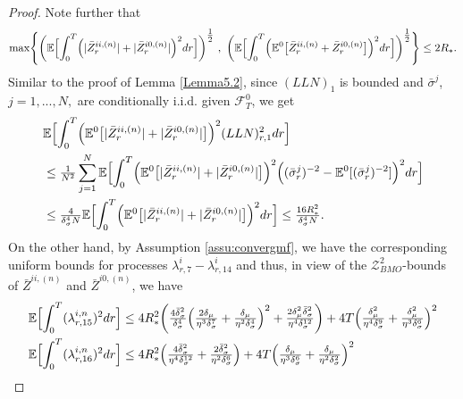 \documentclass[10pt,a4paper]{article}
\theoremstyle{plain}
\theoremstyle{definition}
\numberwithin{equation}{section}
\begin{document}
\begin{proof}
Note further that
\begin{align}
\max\Biggl\{\biggl(\mathbb{E}\Bigl[\int_{0}^{T}\Bigl(|\bar{Z}_{r}^{ii,(n)}| + |\bar{Z}_{r}^{i0,(n)}|\Bigr)^{2}dr\Bigr]\biggr)^{\tfrac{1}{2}} \ , \ \biggl(\mathbb{E}\Bigl[\int_{0}^{T}\Bigl(\mathbb{E}^{0}\bigl[\bar{Z}_{r}^{ii,(n)}+\bar{Z}_{r}^{i0,(n)}\bigr]\Bigr)^{2}dr\Bigr]\biggr)^{\tfrac{1}{2}}\Biggr\} \leq 2R_{*}. \label{equ:5.est1}
\end{align}
Similar to the proof of Lemma \ref{Lemma5.2}, since $(LLN)_{1}$ is bounded and $\bar{\sigma}^{j}$, $j=1,...,N,$ are conditionally i.i.d. given $\mathcal{F}_{T}^{0}$, we get
\begin{align}
&\mathbb{E}\Bigl[\int_{0}^{T}\Bigl(\mathbb{E}^{0}\bigl[|\bar{Z}_{r}^{ii,(n)}|+|\bar{Z}_{r}^{i0,(n)}|\bigr]\Bigr)^{2}(LLN)_{r,1}^{2}dr\Bigr] \nonumber \\
&\leq \tfrac{1}{N^{2}}\sum_{j=1}^{N}\mathbb{E}\Bigl[\int_{0}^{T}\Bigl(\mathbb{E}^{0}\bigl[|\bar{Z}_{r}^{ii,(n)}|+|\bar{Z}_{r}^{i0,(n)}|\bigr]\Bigr)^{2}\Bigl((\bar{\sigma}_{r}^{j})^{-2}-\mathbb{E}^{0}[(\bar{\sigma}_{r}^{j})^{-2}]\Bigr)^{2}dr\Bigr] \nonumber \\
&\leq \tfrac{4}{\delta_{\sigma}^{4}N}\mathbb{E}\Bigl[\int_{0}^{T}\Bigl(\mathbb{E}^{0}\bigl[|\bar{Z}_{r}^{ii,(n)}|+|\bar{Z}_{r}^{i0,(n)}|\bigr]\Bigr)^{2}dr\Bigr] 
\leq \tfrac{16R_{*}^{2}}{\delta_{\sigma}^{4}N}. \label{equ:5.est2}
\end{align}
On the other hand, by Assumption \ref{assu:convergmf}, we have the corresponding uniform bounds for processes $\lambda_{r,7}^{i}-\lambda_{r,14}^{i}$ and thus, in view of the $\mathcal{Z}_{BMO}^{2}$-bounds of $\bar{Z}^{ii,(n)}$ and $\bar{Z}^{i0,(n)}$, we have
\begin{align}
\mathbb{E}\Bigl[\int_{0}^{T}(\lambda_{r,15}^{i,n})^{2}dr\Bigr] &\leq 4R_{*}^{2}\biggl(\tfrac{4\bar{\delta}_{\sigma}^{2}}{\delta_{\sigma}^{4}}\Bigl(\tfrac{2\delta_{\mu}}{\eta^{3}\delta_{\sigma}^{7}} + \tfrac{\delta_{\mu}}{\eta^{2}\delta_{\sigma}^{4}}\Bigr)^{2} + \tfrac{2\delta_{\mu}^{2}\bar{\delta}_{\sigma}^{2}}{\eta^{4}\delta_{\sigma}^{12}}\biggr) + 4T\Bigl(\tfrac{\delta_{\mu}^{2}}{\eta^{4}\delta_{\sigma}^{9}} + \tfrac{\delta_{\mu}^{2}}{\eta^{3}\delta_{\sigma}^{6}}\Bigr)^{2} \label{equ:estlambda15} \\
\mathbb{E}\Bigl[\int_{0}^{T}(\lambda_{r,16}^{i,n})^{2}dr\Bigr] &\leq 4R_{*}^{2}\Bigl(\tfrac{4\bar{\delta}_{\sigma}^{2}}{\eta^{4}\delta_{\sigma}^{12}} + \tfrac{2\bar{\delta}_{\sigma}^{2}}{\eta^{2}\delta_{\sigma}^{6}}\Bigr) + 4T\Bigl(\tfrac{\delta_{\mu}}{\eta^{3}\delta_{\sigma}^{6}} + \tfrac{\delta_{\mu}}{\eta^{2}\delta_{\sigma}^{2}}\Bigr)^{2} \label{equ:estlambda16} \\

\end{align}
\end{proof}
\end{document}
